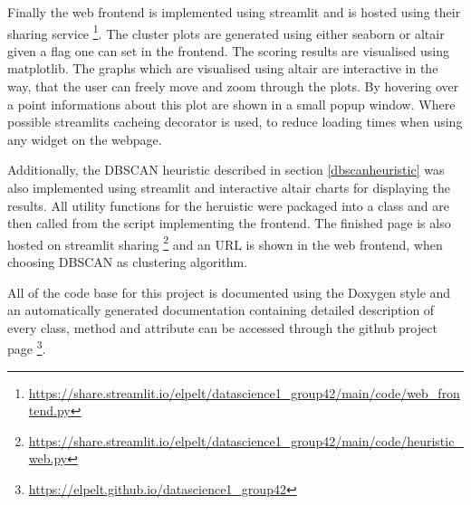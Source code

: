 Finally the web frontend is implemented using streamlit and is hosted using their sharing service \footnote{\scriptsize\url{https://share.streamlit.io/elpelt/datascience1_group42/main/code/web_frontend.py}}. The cluster plots are generated using either seaborn or altair given a flag one can set in the frontend. The scoring results are visualised using matplotlib. The graphs which are visualised using altair are interactive in the way, that the user can freely move and zoom through the plots. By hovering over a point informations about this plot are shown in a small popup window. Where possible streamlits cacheing decorator is used, to reduce loading times when using any widget on the webpage.

Additionally, the DBSCAN heuristic described in section \ref{dbscanheuristic} was also implemented using streamlit and interactive altair charts for displaying the results. All utility functions for the heruistic were packaged into a class and are then called from the script implementing the frontend. The finished page is also hosted on streamlit sharing \footnote{\scriptsize\url{https://share.streamlit.io/elpelt/datascience1_group42/main/code/heuristic_web.py}} and an URL is shown in the web frontend, when choosing DBSCAN as clustering algorithm.

All of the code base for this project is documented using the Doxygen style and an automatically generated documentation containing detailed description of every class, method and attribute can be accessed through the github project page \footnote{\scriptsize\url{https://elpelt.github.io/datascience1_group42}}.